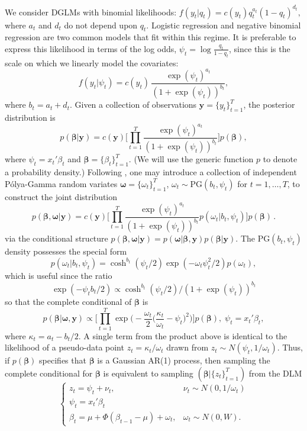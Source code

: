 \documentclass[12pt]{article}
\newcommand{\Polya}{P\'{o}lya}
\newcommand{\PG}{\text{PG}}
\newcommand{\bbeta}{\boldsymbol{\beta}}
\newcommand{\oomega}{\boldsymbol{\omega}}
\newcommand{\yy}{\boldsymbol{y}}
\begin{document}
We consider DGLMs with binomial likelihoods: \( f(y_t | q_t) = c(y_t) q_t^{a_t}
(1-q_t)^{d_t}, \) where $a_t$ and $d_t$ do not depend upon $q_t$.  Logistic
regression and negative binomial regression are two common models that fit
within this regime.  It is preferable to express this likelihood in terms of the
log odds, $\psi_t = \log \frac{q_t}{1-q_t}$, since this is the scale on which we
linearly model the covariates:
\[
f(y_t | \psi_t) = c(y_t) \, \frac{\exp(\psi_t)^{a_t}}{(1+\exp(\psi_t))^{b_t}},
\]
where $b_t = a_t + d_t$.  Given a collection of observations $\yy =
\{y_t\}_{t=1}^T$, the posterior distribution is
\[
p(\bbeta | \yy) = c(\yy) \Big[ \prod_{t=1}^T
\frac{\exp({\psi_t})^{a_t}}{(1+\exp({\psi_t}))^{b_t}}
 \Big] p(\bbeta),
\]
where $\psi_t = x_t' \beta_t$ and $\bbeta = \{\beta_t\}_{t=1}^T$.  (We will use
the generic function $p$ to denote a probability density.)  Following
\cite{polson-etal-2013}, one may introduce a collection of independent
\Polya-Gamma random variates $\oomega = \{\omega_t\}_{t=1}^T$, $\omega_t \sim
\PG(b_t, \psi_t)$ for $t=1, \ldots, T$, to construct the joint distribution
\[
p(\bbeta, \oomega | \yy) = c(\yy) \Big[ \prod_{t=1}^T
\frac{\exp({\psi_t})^{a_t}}{(1+\exp({\psi_t}))^{b_t}} p(\omega_t | b_t, \psi_t)
\Big] p(\bbeta) \, .
\]
via the conditional structure $p(\bbeta, \oomega | \yy) = p(\oomega | \bbeta,
\yy) p(\bbeta | \yy)$.  The $\PG{}(b_t, \psi_t)$ density possesses the special
form
\[
p(\omega_t | b_t, \psi_t) = \cosh^{b_t}(\psi_t/2) \exp({- \omega_t \psi_t^2 / 2})
p(\omega_t),
\]
which is useful since the ratio 
\begin{equation}
\label{eqn:pg-cancellation}
\exp({-\psi_t b_t/2}) \propto \cosh^{b_t}(\psi_t/2) / (1+\exp({\psi_t}))^{b_t}
\end{equation}
so that the complete conditional of $\bbeta$ is
\[
p(\bbeta | \oomega, \yy) \propto \Big[ \prod_{t=1}^T \exp \Big(-\frac{\omega_t}{2}
\Big(\frac{\kappa_t}{\omega_t} - \psi_t\Big)^2 \Big) \Big] p(\bbeta), \; \psi_t
= x_t' \beta_t,
\]
where $\kappa_t = a_t - b_t / 2$.  A single term from the product above is
identical to the likelihood of a pseudo-data point $z_t = \kappa_t / \omega_t$
drawn from $z_t \sim N(\psi_t, 1/\omega_t)$.  Thus, if $p(\bbeta)$ specifies
that $\bbeta$ is a Gaussian AR(1) process, then sampling the complete
conditional for $\bbeta$ is equivalent to sampling $(\bbeta | \{z_t\}_{t=1}^T)$
from the DLM
\[
\begin{cases}
z_t = \psi_t + \nu_t, & \nu_t \sim N(0, 1/\omega_t) \\
\psi_t = x_t' \beta_t \\
\beta_t = \mu + \Phi (\beta_{t-1} - \mu) + \omega_t, & \omega_t \sim N(0, W).
\end{cases}
\]
\end{document}
